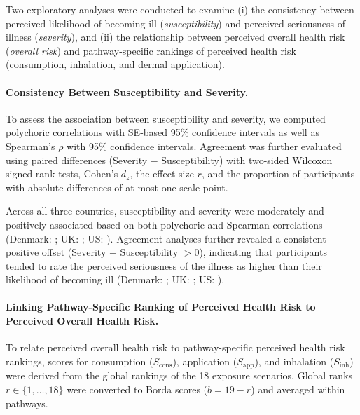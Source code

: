 Two exploratory analyses were conducted to examine (i) the consistency between perceived likelihood of becoming ill (\emph{susceptibility}) and perceived seriousness of illness (\emph{severity}), and (ii) the relationship between perceived overall health risk (\emph{overall risk}) and pathway-specific rankings of perceived health risk (consumption, inhalation, and dermal application).

\paragraph{Consistency Between Susceptibility and Severity.}
To assess the association between susceptibility and severity, we computed polychoric correlations with SE-based 95\% confidence intervals as well as Spearman's $\rho$ with 95\% confidence intervals. Agreement was further evaluated using paired differences (Severity $-$ Susceptibility) with two-sided Wilcoxon signed-rank tests, Cohen's $d_z$, the effect-size $r$, and the proportion of participants with absolute differences of at most one scale point.

Across all three countries, susceptibility and severity were moderately and positively associated based on both polychoric and Spearman correlations (Denmark: ; UK: ; US: ). Agreement analyses further revealed a consistent positive offset (Severity $-$ Susceptibility $> 0$), indicating that participants tended to rate the perceived seriousness of the illness as higher than their likelihood of becoming ill (Denmark: ; UK: ; US: ).

\paragraph{Linking Pathway-Specific Ranking of Perceived Health Risk to Perceived Overall Health Risk.}
To relate perceived overall health risk to pathway-specific perceived health risk rankings, scores for consumption ($S_{\mathrm{cons}}$), application ($S_{\mathrm{app}}$), and inhalation ($S_{\mathrm{inh}}$) were derived from the global rankings of the 18 exposure scenarios. Global ranks $r \in \{1,\dots,18\}$ were converted to Borda scores ($b = 19 - r$) and averaged within pathways.

